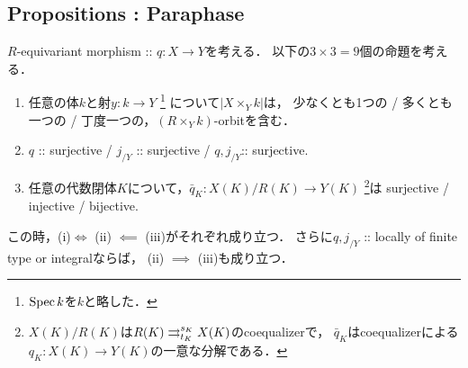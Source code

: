 \documentclass[a4paper, dvipdfmx]{jsarticle}
\begin{document}
\subsection{Propositions : Paraphase}
\begin{Prop}
    $R$-equivariant morphism :: $q \colon X \to Y$を考える．
    以下の$3 \times 3=9$個の命題を考える．
    {\samepage
    \begin{enumerate}
    \item
        任意の体$k$と射$y \colon k \to Y$ \footnote{$\operatorname{Spec} k$を$k$と略した．}
            について$|X \times_{Y} k|$は，\mnewline
        少なくとも1つの / 多くとも一つの / 丁度一つの，$(R \times_{Y} k)$-orbitを含む．
    \item
        $q$ :: surjective / $j_{/Y}$ :: surjective / $q, j_{/Y}$:: surjective.
    \item
        任意の代数閉体$K$について，$\bar{q}_K \colon X(K)/R(K) \to Y(K)$
        \footnote
            {
                $X(K)/R(K)$は$R(K) \mathrel{\mathop{\rightrightarrows}^{s_K}_{t_K}} X(K)$のcoequalizerで，
                $\bar{q}_K$はcoequalizerによる$q_K \colon X(K) \to Y(K)$の一意な分解である．
            }は \mnewline
        surjective / injective / bijective.
    \end{enumerate}
    }

    この時，(i)$ \iff$ (ii) $\impliedby$ (iii)がそれぞれ成り立つ．
    さらに$q, j_{/Y}$ :: locally of finite type or integralならば，
    (ii) $\implies$ (iii)も成り立つ．
\end{Prop}
\end{document}
